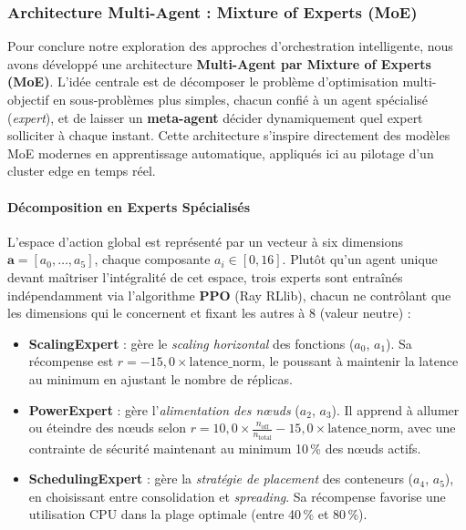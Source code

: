 \subsubsection{Architecture Multi-Agent : Mixture of Experts (MoE)}

Pour conclure notre exploration des approches d'orchestration intelligente, nous avons développé une architecture \textbf{Multi-Agent par Mixture of Experts (MoE)}. L'idée centrale est de décomposer le problème d'optimisation multi-objectif en sous-problèmes plus simples, chacun confié à un agent spécialisé (\textit{expert}), et de laisser un \textbf{meta-agent} décider dynamiquement quel expert solliciter à chaque instant. Cette architecture s'inspire directement des modèles MoE modernes en apprentissage automatique, appliqués ici au pilotage d'un cluster edge en temps réel.

\paragraph{Décomposition en Experts Spécialisés}

L'espace d'action global est représenté par un vecteur à six dimensions $\mathbf{a} = [a_0, \ldots, a_5]$, chaque composante $a_i \in [0, 16]$. Plutôt qu'un agent unique devant maîtriser l'intégralité de cet espace, trois experts sont entraînés indépendamment via l'algorithme \textbf{PPO} (Ray RLlib), chacun ne contrôlant que les dimensions qui le concernent et fixant les autres à 8 (valeur neutre) :

\begin{itemize}
    \item \textbf{ScalingExpert} : gère le \textit{scaling horizontal} des fonctions ($a_0$, $a_1$). Sa récompense est $r = -15{,}0 \times \text{latence\_norm}$, le poussant à maintenir la latence au minimum en ajustant le nombre de réplicas.
    \item \textbf{PowerExpert} : gère l'\textit{alimentation des nœuds} ($a_2$, $a_3$). Il apprend à allumer ou éteindre des nœuds selon $r = 10{,}0 \times \frac{n_{\text{off}}}{n_{\text{total}}} - 15{,}0 \times \text{latence\_norm}$, avec une contrainte de sécurité maintenant au minimum 10\,\% des nœuds actifs.
    \item \textbf{SchedulingExpert} : gère la \textit{stratégie de placement} des conteneurs ($a_4$, $a_5$), en choisissant entre consolidation et \textit{spreading}. Sa récompense favorise une utilisation CPU dans la plage optimale (entre 40\,\% et 80\,\%).
\end{itemize}


